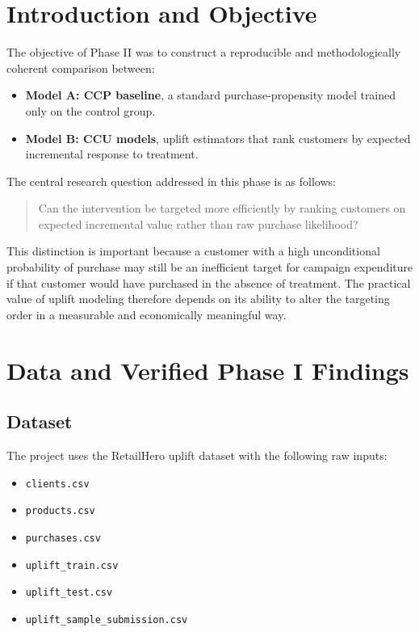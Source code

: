 \documentclass[11pt,a4paper]{article}
\begin{document}
\newpage
\tableofcontents
\newpage
{}

\section{Introduction and Objective}
The objective of Phase II was to construct a reproducible and methodologically coherent comparison between:
\begin{itemize}
    \item \textbf{Model A: CCP baseline}, a standard purchase-propensity model trained only on the control group.
    \item \textbf{Model B: CCU models}, uplift estimators that rank customers by expected incremental response to treatment.
\end{itemize}

The central research question addressed in this phase is as follows:
\begin{quote}
Can the intervention be targeted more efficiently by ranking customers on expected incremental value rather than raw purchase likelihood?
\end{quote}

This distinction is important because a customer with a high unconditional probability of purchase may still be an inefficient target for campaign expenditure if that customer would have purchased in the absence of treatment. The practical value of uplift modeling therefore depends on its ability to alter the targeting order in a measurable and economically meaningful way.

\section{Data and Verified Phase I Findings}
\subsection{Dataset}
The project uses the RetailHero uplift dataset with the following raw inputs:
\begin{itemize}
    \item \texttt{clients.csv}
    \item \texttt{products.csv}
    \item \texttt{purchases.csv}
    \item \texttt{uplift\_train.csv}
    \item \texttt{uplift\_test.csv}
    \item \texttt{uplift\_sample\_submission.csv}
\end{itemize}
\end{document}
